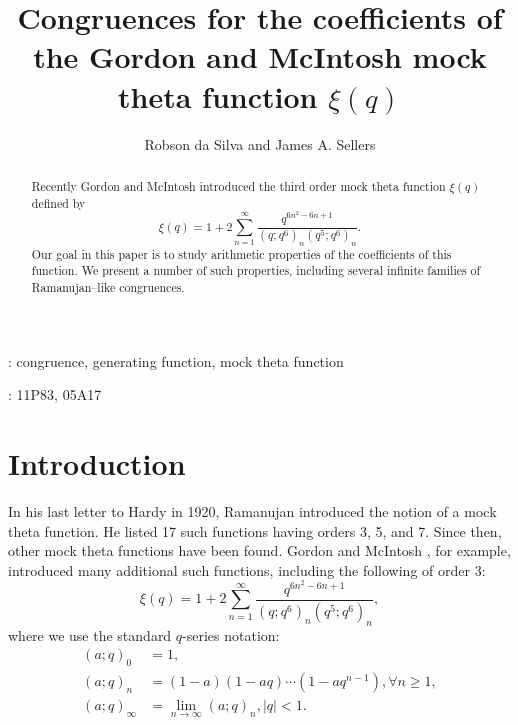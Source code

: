 \documentclass[12pt]{article}
\begin{document}
\title{Congruences for the coefficients of the Gordon and McIntosh mock theta function $\xi(q)$}

\author{Robson da Silva and James A. Sellers}


\date{}
\maketitle

\begin{abstract}
Recently Gordon and McIntosh introduced the third order mock theta function $\xi(q)$ defined by 
$$
\xi(q)=1+2\sum_{n=1}^{\infty}\frac{q^{6n^2-6n+1}}{(q;q^6)_{n}(q^5;q^6)_{n}}.
$$
Our goal in this paper is to study arithmetic properties of the coefficients of this function. We present a number of such properties, including several infinite families of Ramanujan--like congruences.
\end{abstract}

: congruence, generating function, mock theta function

: 11P83, 05A17

\section{Introduction}

In his last letter to Hardy in 1920, Ramanujan introduced the notion of a mock theta function. He listed 17 such functions having orders 3, 5, and 7. Since then, other mock theta functions have been found. Gordon and McIntosh \cite{G-M}, for example, introduced many additional such functions, including the following of order 3:
\begin{equation}
\xi(q)=1+2\sum_{n=1}^{\infty}\frac{q^{6n^2-6n+1}}{(q;q^6)_{n}(q^5;q^6)_{n}},
\label{xi}
\end{equation}
where we use the standard $q$-series notation:
\begin{align*}
(a;q)_0 & = 1, \\
(a;q)_n & = (1-a)(1-aq) \cdots (1-aq^{n-1}), \forall n \geq 1, \\ 
(a;q)_{\infty} & = \lim_{n \to \infty} (a;q)_n, |q|<1.
\end{align*}
\end{document}
